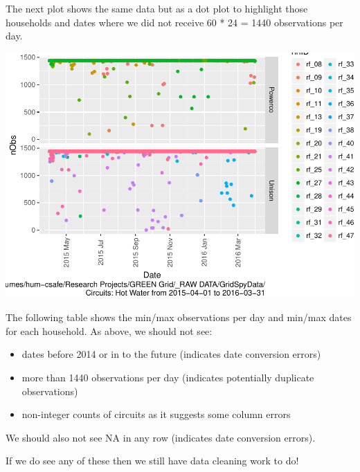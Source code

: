 \documentclass[]{article}
\providecommand{\tightlist}{%
  \setlength{\itemsep}{0pt}\setlength{\parskip}{0pt}}
\begin{document}
The next plot shows the same data but as a dot plot to highlight those
households and dates where we did not receive 60 * 24 = 1440
observations per day.

\includegraphics{nzGGHouseholdPowerDemandProfile_Heat Pump_2015-04-01_2016-03-31_files/figure-latex/loadedFilesObs point plot-1.pdf}

The following table shows the min/max observations per day and min/max
dates for each household. As above, we should not see:

\begin{itemize}
\tightlist
\item
  dates before 2014 or in to the future (indicates date conversion
  errors)
\item
  more than 1440 observations per day (indicates potentially duplicate
  observations)
\item
  non-integer counts of circuits as it suggests some column errors
\end{itemize}

We should also not see NA in any row (indicates date conversion errors).

If we do see any of these then we still have data cleaning work to do!
\end{document}
